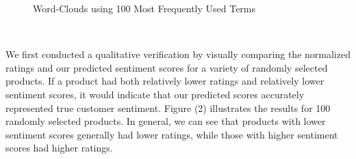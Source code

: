 \documentclass[10pt]{article}
\begin{document}
\begin{figure}[ht!]
    \hspace*{0em}
    \centering 
    \hspace{1em}
    \caption{Word-Clouds using 100 Most Frequently Used Terms}
    \hspace*{\fill}
\end{figure}

\

We first conducted a qualitative verification by visually comparing the normalized ratings and our predicted sentiment scores for a variety of randomly selected products. If a product had both relatively lower ratings and relatively lower sentiment scores, it would indicate that our predicted scores accurately represented true customer sentiment. Figure (2) illustrates the results for 100 randomly selected products. In general, we can see that products with lower sentiment scores generally had lower ratings, while those with higher sentiment scores had higher ratings.
\end{document}
